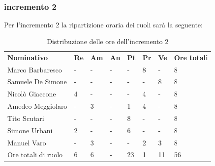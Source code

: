 \subsubsection{incremento 2}
Per l'incremento 2 la ripartizione oraria dei ruoli sarà la seguente:
\begin{center}
    \begin{table}[ht!]
        \centering
        \caption{Distribuzione delle ore dell'incremento 2}
        \vspace{5px}
        \renewcommand{\arraystretch}{1.8}
        \begin{tabular}{p{100px} p{20px} p{20px} p{20px} p{20px} p{20px} p{20px} p{50px} }
            \rowcolor{logo!70} \textbf{Nominativo} & \textbf{Re} & \textbf{Am} & \textbf{An} & \textbf{Pt} & \textbf{Pr} & \textbf{Ve} & \textbf{Ore totali} \\
            Marco Barbaresco                       & -           & -           & -           & -           & 8           & -           & 8                   \\
            Samuele De Simone                      & -           & -           & -           & -           & -           & 8           & 8                   \\
            Nicolò Giaccone                        & 4           & -           & -           & -           & 4           & -           & 8                   \\
            Amedeo Meggiolaro                      & -           & 3           & -           & 1           & 4           & -           & 8                   \\
            Tito Scutari                           & -           & -           & -           & 8           & -           & -           & 8                   \\
            Simone Urbani                          & 2           & -           & -           & 6           & -           & -           & 8                   \\
            Manuel Varo                            & -           & 3           & -           & -           & 2           & 3           & 8                   \\
            Ore totali di ruolo                    & 6           & 6           & -           & 23          & 1           & 11          & 56                  \\
        \end{tabular}
    \end{table}
\end{center}
